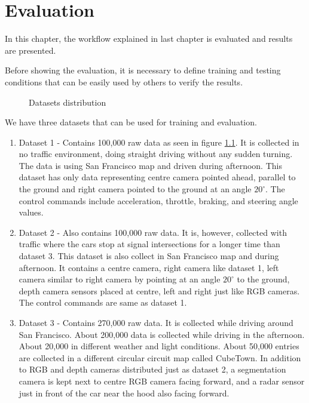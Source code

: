 \chapter{Evaluation}
In this chapter, the workflow explained in last chapter is evaluated and results are
presented.

Before showing the evaluation, it is necessary to define training and testing conditions
that can be easily used by others to verify the results.
\begin{figure}[h]
    \centering
    \def\svgwidth{0.3\textwidth}
    
    \caption{Datasets distribution}
    \label{fig:datasetsdistribution}
\end{figure}

We have three datasets that can be used for training and evaluation.
\begin{enumerate}
    \item Dataset 1 - Contains 100,000 raw data as seen in figure
        \ref{fig:datasetsdistribution}. It is collected in no traffic
        environment, doing straight driving without any sudden turning. The data is using
        San Francisco map and driven during afternoon. This dataset has only data
        representing centre camera pointed ahead, parallel to the ground and right camera
        pointed to the ground at an angle $20^{\circ}$. The control commands include
        acceleration, throttle, braking, and steering angle values.
    \item Dataset 2 - Also contains 100,000 raw data. It is, however, collected with traffic
        where the cars stop at signal intersections for a longer time than dataset 3. This
        dataset is also collect in San Francisco map and during afternoon. It contains a
        centre camera, right camera like dataset 1, left camera similar to right camera by
        pointing at an angle $20^{\circ}$ to the ground, depth camera sensors placed at
        centre, left and right just like RGB cameras. The control commands are same as
        dataset 1.
    \item Dataset 3 - Contains 270,000 raw data. It is collected while driving around San
        Francisco. About 200,000 data is collected while driving in the afternoon. About
        20,000 in different weather and light conditions. About 50,000 entries are
        collected in a different circular circuit map called CubeTown. In addition to RGB
        and depth cameras distributed just as dataset 2, a segmentation camera is kept
        next to centre RGB camera facing forward, and a radar sensor just in front of the
        car near the hood also facing forward.

\end{enumerate}

